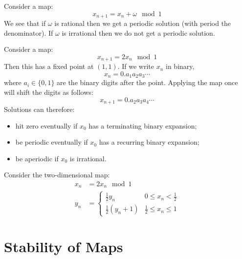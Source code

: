 \documentclass[../Main.tex]{subfiles}
\begin{document}
\begin{example}
    \label{exRotMap}
    Consider a map:
    \begin{equation*}
        x_{n+1} = x_n + \omega \mod 1
    \end{equation*}
    We see that if $\omega$ is rational then we get a periodic solution (with period the denominator). If $\omega$ is irrational then we do not get a periodic solution.
\end{example}
\begin{example}
    \label{exSawToothMap}
    Consider a map:
    \begin{equation*}
        x_{n+1} = 2x_n \mod 1
    \end{equation*}
    Then this has a fixed point at $(1, 1)$. If we write $x_n$ in binary,
    \begin{equation*}
        x_n = 0.a_1a_2a_3\cdots
    \end{equation*}
    where $a_i \in \{0, 1\}$ are the binary digits after the point. Applying the map once will shift the digits as follows:
    \begin{equation*}
        x_{n+1} = 0.a_2a_3a_4\cdots
    \end{equation*}
    Solutions can therefore:
    \begin{itemize}
        \item hit zero eventually if $x_0$ has a terminating binary expansion;
        \item be periodic eventually if $x_0$ has a recurring binary expansion;
        \item be aperiodic if $x_0$ is irrational.
    \end{itemize}
\end{example}
\begin{example}
    Consider the two-dimensional map:
    \begin{align*}
        x_n &= 2x_n \mod 1 \\
        y_n &= \begin{cases}
            \frac12 y_n & 0 \leq x_n < \frac12 \\
            \frac12 (y_n + 1) & \frac12 \leq x_n \leq 1
        \end{cases}
    \end{align*}
\end{example}
\section{Stability of Maps}
\end{document}
